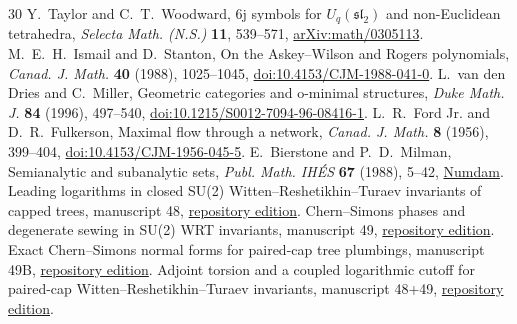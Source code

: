 \begin{thebibliography}{30}
 Y.~Taylor and C.~T.~Woodward, 6j symbols for \(U_q(\mathfrak{sl}_2)\) and non-Euclidean tetrahedra, \emph{Selecta Math. (N.S.)} \textbf{11}, 539--571, \href{https://arxiv.org/abs/math/0305113}{arXiv:math/0305113}.
 M.~E.~H.~Ismail and D.~Stanton, On the Askey--Wilson and Rogers polynomials, \emph{Canad. J. Math.} \textbf{40} (1988), 1025--1045, \href{https://doi.org/10.4153/CJM-1988-041-0}{doi:10.4153/CJM-1988-041-0}.
 L.~van den Dries and C.~Miller, Geometric categories and o-minimal structures, \emph{Duke Math. J.} \textbf{84} (1996), 497--540, \href{https://doi.org/10.1215/S0012-7094-96-08416-1}{doi:10.1215/S0012-7094-96-08416-1}.
 L.~R.~Ford Jr. and D.~R.~Fulkerson, Maximal flow through a network, \emph{Canad. J. Math.} \textbf{8} (1956), 399--404, \href{https://doi.org/10.4153/CJM-1956-045-5}{doi:10.4153/CJM-1956-045-5}.
 E.~Bierstone and P.~D.~Milman, Semianalytic and subanalytic sets, \emph{Publ. Math. IH\'ES} \textbf{67} (1988), 5--42, \href{https://numdam.org/item/PMIHES_1988__67__5_0/}{Numdam}.
 Leading logarithms in closed SU(2) Witten--Reshetikhin--Turaev invariants of capped trees, manuscript 48, \href{https://github.com/g3173028019-beep/ai-automated-quantum-gravity-research/tree/main/papers/48-wrt-leading-logarithms}{repository edition}.
 Chern--Simons phases and degenerate sewing in SU(2) WRT invariants, manuscript 49, \href{https://github.com/g3173028019-beep/ai-automated-quantum-gravity-research/tree/main/papers/49-wrt-semiclassical-sewing}{repository edition}.
 Exact Chern--Simons normal forms for paired-cap tree plumbings, manuscript 49B, \href{https://github.com/g3173028019-beep/ai-automated-quantum-gravity-research/tree/main/papers/49b-cs-normal-forms}{repository edition}.
 Adjoint torsion and a coupled logarithmic cutoff for paired-cap Witten--Reshetikhin--Turaev invariants, manuscript 48+49, \href{https://github.com/g3173028019-beep/ai-automated-quantum-gravity-research/tree/main/papers/48-49-wrt-torsion-bridge}{repository edition}.
\end{thebibliography}
